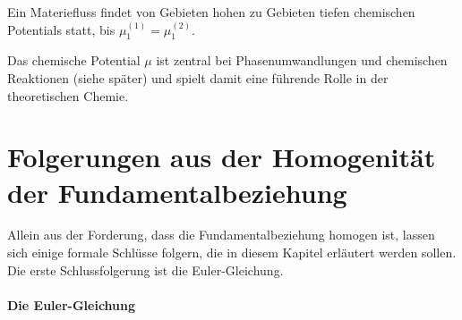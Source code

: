\begin{formal}
    Ein Materiefluss findet von Gebieten hohen zu Gebieten tiefen chemischen Potentials statt, bis $\mu_1^{(1)} = \mu_1^{(2)}$.
\end{formal}

Das chemische Potential $\mu$ ist zentral bei Phasenumwandlungen und chemischen Reaktionen (siehe später) und spielt damit eine führende Rolle in der theoretischen Chemie.



\section{Folgerungen aus der Homogenität der Fundamentalbeziehung}

Allein aus der Forderung, dass die Fundamentalbeziehung homogen ist, lassen sich einige formale Schlüsse folgern, die in diesem Kapitel erläutert werden sollen. Die erste Schlussfolgerung ist die Euler-Gleichung.

\paragraph*{Die Euler-Gleichung}

